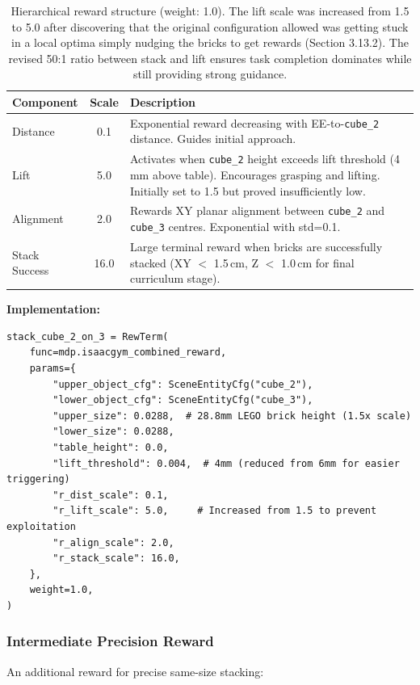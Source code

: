\documentclass[12pt,a4paper,oneside]{report}
\begin{document}
\begin{table}[h]
\centering
\small
\begin{tabular}{|l|c|p{8cm}|}
\hline
\textbf{Component} & \textbf{Scale} & \textbf{Description} \\
\hline
Distance & 0.1 & Exponential reward decreasing with EE-to-\texttt{cube\_2} distance. Guides initial approach. \\
\hline
Lift & 5.0 & Activates when \texttt{cube\_2} height exceeds lift threshold (4\,mm above table). Encourages grasping and lifting. Initially set to 1.5 but proved insufficiently low. \\
\hline
Alignment & 2.0 & Rewards XY planar alignment between \texttt{cube\_2} and \texttt{cube\_3} centres. Exponential with std=0.1. \\
\hline
Stack Success & 16.0 & Large terminal reward when bricks are successfully stacked (XY $<$ 1.5\,cm, Z $<$ 1.0\,cm for final curriculum stage). \\
\hline
\end{tabular}
\caption{Hierarchical reward structure (weight: 1.0). The lift scale was increased from 1.5 to 5.0 after discovering that the original configuration allowed was getting stuck in a local optima simply nudging the bricks to get rewards (Section 3.13.2). The revised 50:1 ratio between stack and lift ensures task completion dominates while still providing strong guidance.}
\end{table}

\textbf{Implementation:}
\begin{lstlisting}
stack_cube_2_on_3 = RewTerm(
    func=mdp.isaacgym_combined_reward,
    params={
        "upper_object_cfg": SceneEntityCfg("cube_2"),
        "lower_object_cfg": SceneEntityCfg("cube_3"),
        "upper_size": 0.0288,  # 28.8mm LEGO brick height (1.5x scale)
        "lower_size": 0.0288,
        "table_height": 0.0,
        "lift_threshold": 0.004,  # 4mm (reduced from 6mm for easier triggering)
        "r_dist_scale": 0.1,
        "r_lift_scale": 5.0,     # Increased from 1.5 to prevent exploitation
        "r_align_scale": 2.0,
        "r_stack_scale": 16.0,
    },
    weight=1.0,
)
\end{lstlisting}

\subsubsection{Intermediate Precision Reward}

An additional reward for precise same-size stacking:
\end{document}
